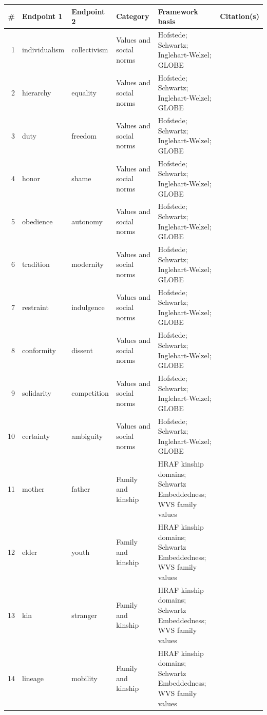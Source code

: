 \begin{tabular}{@{}rlllll@{}}
\toprule
\# & Endpoint 1 & Endpoint 2 & Category & Framework basis & Citation(s) \\
\midrule
1 & individualism & collectivism & Values and social norms & Hofstede; Schwartz; Inglehart-Welzel; GLOBE & \cite{hofstede2001culture,schwartz2006theory} \\
2 & hierarchy & equality & Values and social norms & Hofstede; Schwartz; Inglehart-Welzel; GLOBE & \cite{hofstede2001culture,schwartz2006theory} \\
3 & duty & freedom & Values and social norms & Hofstede; Schwartz; Inglehart-Welzel; GLOBE & \cite{inglehart2005modernization} \\
4 & honor & shame & Values and social norms & Hofstede; Schwartz; Inglehart-Welzel; GLOBE & \cite{house2004culture} \\
5 & obedience & autonomy & Values and social norms & Hofstede; Schwartz; Inglehart-Welzel; GLOBE & \cite{schwartz2006theory} \\
6 & tradition & modernity & Values and social norms & Hofstede; Schwartz; Inglehart-Welzel; GLOBE & \cite{inglehart2005modernization} \\
7 & restraint & indulgence & Values and social norms & Hofstede; Schwartz; Inglehart-Welzel; GLOBE & \cite{hofstede2001culture} \\
8 & conformity & dissent & Values and social norms & Hofstede; Schwartz; Inglehart-Welzel; GLOBE & \cite{schwartz2006theory} \\
9 & solidarity & competition & Values and social norms & Hofstede; Schwartz; Inglehart-Welzel; GLOBE & \cite{house2004culture} \\
10 & certainty & ambiguity & Values and social norms & Hofstede; Schwartz; Inglehart-Welzel; GLOBE & \cite{hofstede2001culture} \\
11 & mother & father & Family and kinship & HRAF kinship domains; Schwartz Embeddedness; WVS family values & \cite{house2004culture} \\
12 & elder & youth & Family and kinship & HRAF kinship domains; Schwartz Embeddedness; WVS family values & \cite{hofstede2001culture} \\
13 & kin & stranger & Family and kinship & HRAF kinship domains; Schwartz Embeddedness; WVS family values & \cite{schwartz2006theory} \\
14 & lineage & mobility & Family and kinship & HRAF kinship domains; Schwartz Embeddedness; WVS family values & \cite{inglehart2005modernization} \\

\end{tabular}
